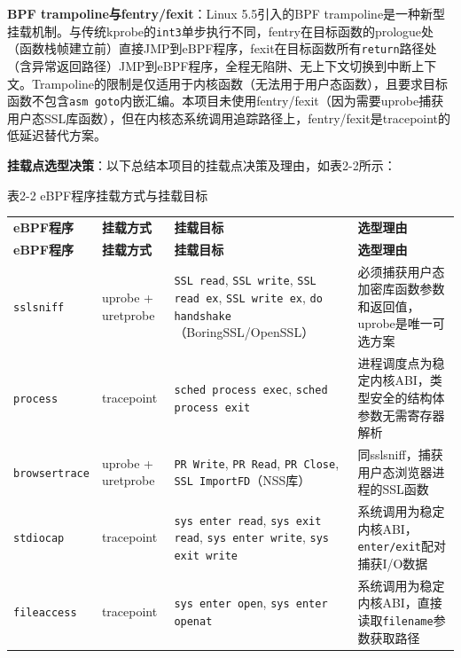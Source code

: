 \documentclass[a4paper]{ctexart}
\makeatletter
\renewcommand{\_}{%
  \ifmmode
    \nfss@text{\textunderscore}%
  \else
    \textunderscore\discretionary{}{}{}%
  \fi}
\makeatother
\begin{document}
\textbf{BPF trampoline与fentry/fexit}：Linux 5.5引入的BPF trampoline是一种新型挂载机制。与传统kprobe的\texttt{int3}单步执行不同，fentry在目标函数的prologue处（函数栈帧建立前）直接JMP到eBPF程序，fexit在目标函数所有\texttt{return}路径处（含异常返回路径）JMP到eBPF程序，全程无陷阱、无上下文切换到中断上下文。Trampoline的限制是仅适用于内核函数（无法用于用户态函数），且要求目标函数不包含\texttt{asm goto}内嵌汇编。本项目未使用fentry/fexit（因为需要uprobe捕获用户态SSL库函数），但在内核态系统调用追踪路径上，fentry/fexit是tracepoint的低延迟替代方案。


\textbf{挂载点选型决策}：以下总结本项目的挂载点决策及理由，如表2-2所示：




\medskip
{\centering\small
表2-2 eBPF程序挂载方式与挂载目标\par
\vspace{3pt}
\setlength{\tabcolsep}{6pt}
\renewcommand{\arraystretch}{1.1}
\begin{longtable}{>{\raggedright\arraybackslash}p{3.3cm} >{\raggedright\arraybackslash}p{3.3cm} >{\raggedright\arraybackslash}p{3.3cm} >{\raggedright\arraybackslash}p{3.3cm}}
\hline
\textbf{eBPF程序} & \textbf{挂载方式} & \textbf{挂载目标} & \textbf{选型理由} \\*
\hline
\endfirsthead
\hline
\textbf{eBPF程序} & \textbf{挂载方式} & \textbf{挂载目标} & \textbf{选型理由} \\
\hline
\endhead
\hline
\endfoot
\hline
\endlastfoot
\texttt{sslsniff} & uprobe + uretprobe & \texttt{SSL\_read}, \texttt{SSL\_write}, \texttt{SSL\_read\_ex}, \texttt{SSL\_write\_ex}, \texttt{do\_handshake}（BoringSSL/OpenSSL） & 必须捕获用户态加密库函数参数和返回值，uprobe是唯一可选方案 \\*
\hline
\texttt{process} & tracepoint & \texttt{sched\_process\_exec}, \texttt{sched\_process\_exit} & 进程调度点为稳定内核ABI，类型安全的结构体参数无需寄存器解析 \\
\hline
\texttt{browsertrace} & uprobe + uretprobe & \texttt{PR\_Write}, \texttt{PR\_Read}, \texttt{PR\_Close}, \texttt{SSL\_ImportFD}（NSS库） & 同sslsniff，捕获用户态浏览器进程的SSL函数 \\
\hline
\texttt{stdiocap} & tracepoint & \texttt{sys\_enter\_read}, \texttt{sys\_exit\_read}, \texttt{sys\_enter\_write}, \texttt{sys\_exit\_write} & 系统调用为稳定内核ABI，\texttt{enter/exit}配对捕获I/O数据 \\
\hline
\texttt{fileaccess} & tracepoint & \texttt{sys\_enter\_open}, \texttt{sys\_enter\_openat} & 系统调用为稳定内核ABI，直接读取\texttt{filename}参数获取路径 \\
\hline
\end{longtable}
\par}
\end{document}
